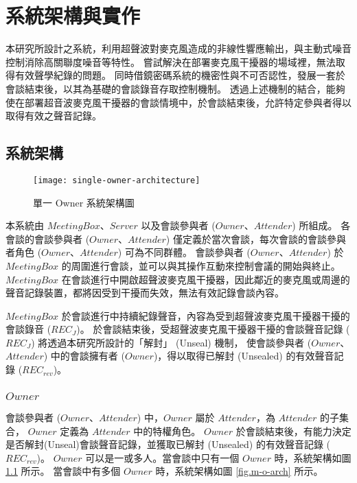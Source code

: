 \chapter{系統架構與實作}

    本研究所設計之系統，利用超聲波對麥克風造成的非線性響應輸出，與主動式噪音控制消除高關聯度噪音等特性。
嘗試解決在部署麥克風干擾器的場域裡，無法取得有效聲學紀錄的問題。
同時借鏡密碼系統的機密性與不可否認性，發展一套於會談結束後，以其為基礎的會談錄音存取控制機制。
透過上述機制的結合，能夠使在部署超音波麥克風干擾器的會談情境中，於會談結束後，允許特定參與者得以取得有效之聲音記錄。

\section{系統架構}

\begin{figure}[H]
    \centering
    \texttt{[image: single-owner-architecture]}
    \caption{單一 Owner 系統架構圖}
    \label{fig.s-o-arch}
\end{figure}

    本系統由 $MeetingBox$、$Server$ 以及會談參與者 ($Owner$、$Attender$) 所組成。
各會談的會談參與者 ($Owner$、$Attender$) 僅定義於當次會談，每次會談的會談參與者角色 ($Owner$、$Attender$) 可為不同群體。
會談參與者 ($Owner$、$Attender$) 於 $MeetingBox$ 的周圍進行會談，並可以與其操作互動來控制會議的開始與終止。
$MeetingBox$ 在會談進行中開啟超聲波麥克風干擾器，因此鄰近的麥克風或周邊的聲音記錄裝置，都將因受到干擾而失效，無法有效記錄會談內容。

    $MeetingBox$ 於會談進行中持續紀錄聲音，內容為受到超聲波麥克風干擾器干擾的會談錄音 ($REC_{J}$)。
於會談結束後，受超聲波麥克風干擾器干擾的會談聲音記錄 ($REC_{J}$) 將透過本研究所設計的「解封」 (Unseal) 機制，
使會談參與者 ($Owner$、$Attender$) 中的會談擁有者 ($Owner$)，得以取得已解封 (Unsealed) 的有效聲音記錄 ($REC_{rev}$)。

\subsection{$Owner$}

    會談參與者 ($Owner$、$Attender$) 中，$Owner$ 屬於 $Attender$，為 $Attender$ 的子集合，
$Owner$ 定義為 $Attender$ 中的特權角色。
$Owner$ 於會談結束後，有能力決定是否解封(Unseal)會談聲音記錄，並獲取已解封 (Unsealed) 的有效聲音記錄 ($REC_{rev}$)。
$Owner$ 可以是一或多人。當會談中只有一個 $Owner$ 時，系統架構如圖 \ref{fig.s-o-arch} 所示。
當會談中有多個 $Owner$ 時，系統架構如圖 \ref{fig.m-o-arch} 所示。

